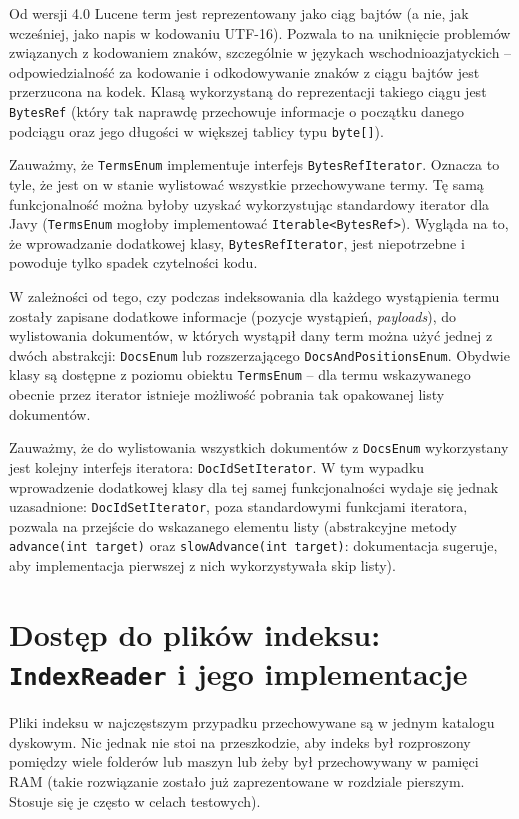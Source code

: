 Od wersji 4.0 Lucene term jest reprezentowany jako ciąg bajtów (a nie, jak wcześniej, jako napis w kodowaniu UTF-16). Pozwala to na uniknięcie problemów związanych z kodowaniem znaków, szczególnie w językach wschodnioazjatyckich -- odpowiedzialność za kodowanie i odkodowywanie znaków z ciągu bajtów jest przerzucona na kodek. Klasą wykorzystaną do reprezentacji takiego ciągu jest \texttt{BytesRef} (który tak naprawdę przechowuje informacje o początku danego podciągu oraz jego długości w większej tablicy typu \texttt{byte[]}).

Zauważmy, że \texttt{TermsEnum} implementuje interfejs \texttt{BytesRefIterator}. Oznacza to tyle, że jest on w stanie wylistować wszystkie przechowywane termy. Tę samą funkcjonalność można byłoby uzyskać wykorzystując standardowy iterator dla Javy (\texttt{TermsEnum} mogłoby implementować \texttt{Iterable<BytesRef>}). Wygląda na to, że wprowadzanie dodatkowej klasy, \texttt{BytesRefIterator}, jest niepotrzebne i powoduje tylko spadek czytelności kodu.

W zależności od tego, czy podczas indeksowania dla każdego wystąpienia termu zostały zapisane dodatkowe informacje (pozycje wystąpień, \emph{payloads}), do wylistowania dokumentów, w których wystąpił dany term można użyć jednej z dwóch abstrakcji: \texttt{DocsEnum} lub rozszerzającego \texttt{DocsAndPositionsEnum}. Obydwie klasy są dostępne z poziomu obiektu \texttt{TermsEnum} -- dla termu wskazywanego obecnie przez iterator istnieje możliwość pobrania tak opakowanej listy dokumentów.

Zauważmy, że do wylistowania wszystkich dokumentów z \texttt{DocsEnum} wykorzystany jest kolejny interfejs iteratora: \texttt{DocIdSetIterator}. W tym wypadku wprowadzenie dodatkowej klasy dla tej samej funkcjonalności wydaje się jednak uzasadnione: \texttt{DocIdSetIterator}, poza standardowymi funkcjami iteratora, pozwala na przejście do wskazanego elementu listy (abstrakcyjne metody \texttt{advance(int target)} oraz \texttt{slowAdvance(int target)}: dokumentacja sugeruje, aby implementacja pierwszej z nich wykorzystywała skip listy).

\section{Dostęp do plików indeksu: \texttt{IndexReader} i jego implementacje}
\label{sec:indexReader}

Pliki indeksu w najczęstszym przypadku przechowywane są w jednym katalogu dyskowym. Nic jednak nie stoi na przeszkodzie, aby indeks był rozproszony pomiędzy wiele folderów lub maszyn lub żeby był przechowywany w pamięci RAM (takie rozwiązanie zostało już zaprezentowane w rozdziale pierszym. Stosuje się je często w celach testowych).

